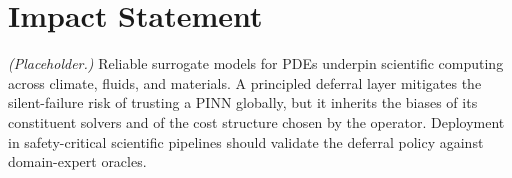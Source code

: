 \section*{Impact Statement}
\label{sec:impact}

\emph{(Placeholder.)} Reliable surrogate models for PDEs underpin scientific
computing across climate, fluids, and materials. A principled deferral layer
mitigates the silent-failure risk of trusting a PINN globally, but it
inherits the biases of its constituent solvers and of the cost structure
chosen by the operator. Deployment in safety-critical scientific pipelines
should validate the deferral policy against domain-expert oracles.

